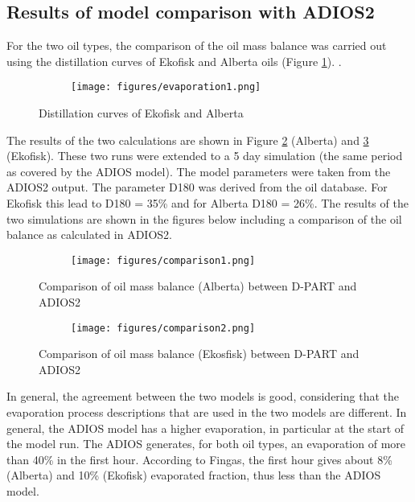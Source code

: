 \documentclass[english]{deltares_manual}
\begin{document}
\subsection{Results of model comparison with ADIOS2}
For the two oil types, the comparison of the oil mass balance was carried out using the distillation curves of Ekofisk and Alberta oils (Figure \ref{fig:evapoil}). .
\begin{figure}[h!]
	\begin{subfigure}{1.0\textwidth}
		\texttt{[image: figures/evaporation1.png]}
	\end{subfigure}
	\caption{Distillation curves of Ekofisk and Alberta}
	\label{fig:evapoil}
\end{figure}

The results of the two calculations are shown in Figure \ref{fig:comparebalance1} (Alberta) and \ref{fig:comparebalance2} (Ekofisk). These two runs were extended to a 5 day simulation (the same period as covered by the ADIOS model). The model parameters were taken from the ADIOS2 output. The parameter D180 was derived from the oil database. 
For Ekofisk this lead to D180 = 35\% and for Alberta D180 = 26\%. The results of the two simulations are shown in the figures below including a comparison of the oil balance as calculated in ADIOS2.
\begin{figure}[h!]
	\begin{subfigure}{1.0\textwidth}
		\texttt{[image: figures/comparison1.png]}
	\end{subfigure}
	\caption{Comparison of oil mass balance (Alberta) between D-PART and ADIOS2}
	\label{fig:comparebalance1}
\end{figure}


\begin{figure}[h!]
	\begin{subfigure}{1.0\textwidth}
		\texttt{[image: figures/comparison2.png]}
	\end{subfigure}
	\caption{Comparison of oil mass balance (Ekosfisk) between D-PART and ADIOS2}
	\label{fig:comparebalance2}
\end{figure}

In general, the agreement between the two models is good, considering that the evaporation process descriptions that are used in the two models are different. In general, the ADIOS model has a higher evaporation, in particular at the start of the model run. The ADIOS generates, for both oil types, an evaporation of more than 40\% in the first hour. According to Fingas, the first hour gives about 8\% (Alberta) and 10\% (Ekofisk) evaporated fraction, thus less than the ADIOS model. 
\end{document}

